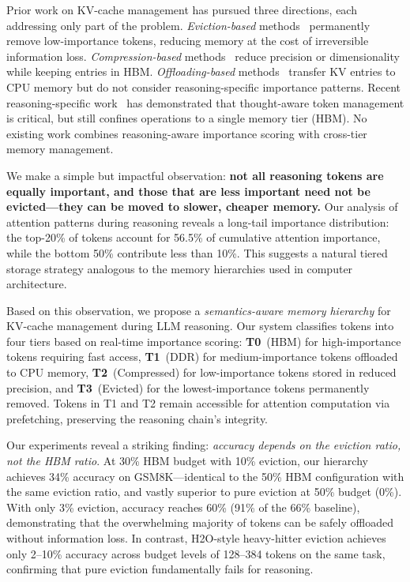 \documentclass{article}
\begin{document}
Prior work on KV-cache management has pursued three directions, each addressing only part of the problem.
\emph{Eviction-based} methods~\cite{h2o, streamingllm, scissorhands} permanently remove low-importance tokens, reducing memory at the cost of irreversible information loss.
\emph{Compression-based} methods~\cite{snapkv, kivi, gear} reduce precision or dimensionality while keeping entries in HBM.
\emph{Offloading-based} methods~\cite{infinigen, arkvale, scoutattention} transfer KV entries to CPU memory but do not consider reasoning-specific importance patterns.
Recent reasoning-specific work~\cite{thinkv, rkv, triattention} has demonstrated that thought-aware token management is critical, but still confines operations to a single memory tier (HBM).
No existing work combines reasoning-aware importance scoring with cross-tier memory management.

We make a simple but impactful observation: \textbf{not all reasoning tokens are equally important, and those that are less important need not be evicted---they can be moved to slower, cheaper memory.}
Our analysis of attention patterns during reasoning reveals a long-tail importance distribution: the top-20\% of tokens account for 56.5\% of cumulative attention importance, while the bottom 50\% contribute less than 10\%.
This suggests a natural tiered storage strategy analogous to the memory hierarchies used in computer architecture.

Based on this observation, we propose a \emph{semantics-aware memory hierarchy} for KV-cache management during LLM reasoning.
Our system classifies tokens into four tiers based on real-time importance scoring:
\textbf{T0}~(HBM) for high-importance tokens requiring fast access,
\textbf{T1}~(DDR) for medium-importance tokens offloaded to CPU memory,
\textbf{T2}~(Compressed) for low-importance tokens stored in reduced precision, and
\textbf{T3}~(Evicted) for the lowest-importance tokens permanently removed.
Tokens in T1 and T2 remain accessible for attention computation via prefetching, preserving the reasoning chain's integrity.

Our experiments reveal a striking finding: \emph{accuracy depends on the eviction ratio, not the HBM ratio}.
At 30\% HBM budget with 10\% eviction, our hierarchy achieves 34\% accuracy on GSM8K---identical to the 50\% HBM configuration with the same eviction ratio, and vastly superior to pure eviction at 50\% budget (0\%).
With only 3\% eviction, accuracy reaches 60\% (91\% of the 66\% baseline), demonstrating that the overwhelming majority of tokens can be safely offloaded without information loss.
In contrast, H2O-style heavy-hitter eviction achieves only 2--10\% accuracy across budget levels of 128--384 tokens on the same task, confirming that pure eviction fundamentally fails for reasoning.
\end{document}
